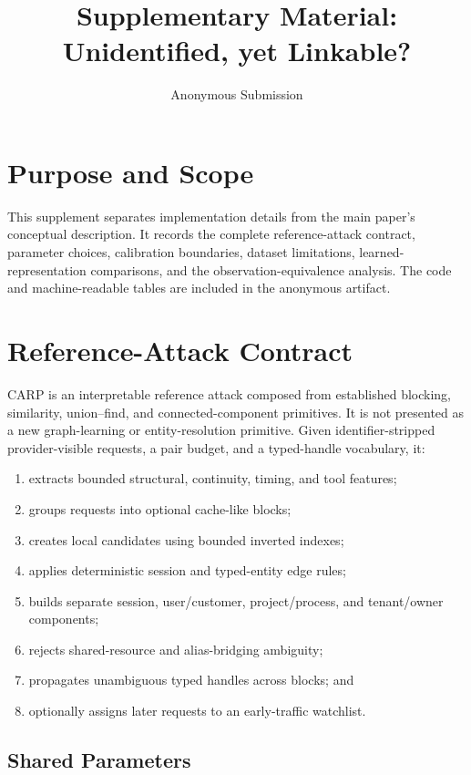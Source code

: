\documentclass[letterpaper]{article} %
\title{Supplementary Material:\\Unidentified, yet Linkable?}
\author{Anonymous Submission}
\newcommand{\carp}{\textsc{CARP}\xspace}
\begin{document}
\maketitle

\section{Purpose and Scope}

This supplement separates implementation details from the main paper's conceptual description.
It records the complete reference-attack contract, parameter choices, calibration boundaries,
dataset limitations, learned-representation comparisons, and the observation-equivalence analysis.
The code and machine-readable tables are included in the anonymous artifact.

\section{Reference-Attack Contract}

\carp is an interpretable reference attack composed from established blocking, similarity,
union--find, and connected-component primitives. It is not presented as a new graph-learning or
entity-resolution primitive. Given identifier-stripped provider-visible requests, a pair budget,
and a typed-handle vocabulary, it:
\begin{enumerate}
  \item extracts bounded structural, continuity, timing, and tool features;
  \item groups requests into optional cache-like blocks;
  \item creates local candidates using bounded inverted indexes;
  \item applies deterministic session and typed-entity edge rules;
  \item builds separate session, user/customer, project/process, and tenant/owner components;
  \item rejects shared-resource and alias-bridging ambiguity;
  \item propagates unambiguous typed handles across blocks; and
  \item optionally assigns later requests to an early-traffic watchlist.
\end{enumerate}

\subsection{Shared Parameters}
\end{document}
